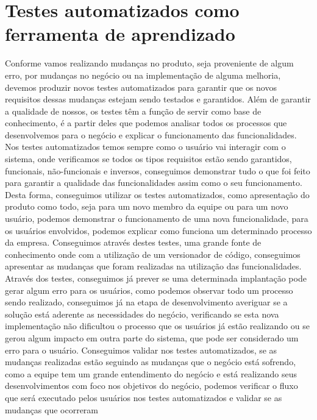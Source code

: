     \section{Testes automatizados como ferramenta de aprendizado}
      Conforme vamos realizando mudanças no produto, seja proveniente de algum erro,
      por mudanças no negócio ou na implementação de alguma melhoria, devemos produzir
      novos testes automatizados para garantir que os novos requisitos dessas mudanças
      estejam sendo testados e garantidos. \newline
      Além de garantir a qualidade de nossos, os testes têm a função de servir
      como base de conhecimento, é a partir deles que podemos analisar todos os
      processos que desenvolvemos para o negócio e explicar o funcionamento das
      funcionalidades. Nos testes automatizados temos sempre como o usuário vai
      interagir com o sistema, onde verificamos se todos os tipos requisitos estão
      sendo garantidos, funcionais, não-funcionais e inversos, conseguimos demonstrar
      tudo o que foi feito para garantir a qualidade das funcionalidades assim
      como o seu funcionamento. Desta forma, conseguimos utilizar os testes automatizados,
      como apresentação do produto como todo, seja para um novo membro da equipe ou
      para um novo usuário, podemos demonstrar o funcionamento de uma nova funcionalidade,
      para os usuários envolvidos, podemos explicar como funciona um determinado
      processo da empresa. Conseguimos através destes testes, uma grande fonte de
      conhecimento onde com a utilização de um versionador de código, conseguimos
      apresentar as mudanças que foram realizadas na utilização das funcionalidades.
      Através dos testes, conseguimos já prever se uma determinada implantação pode
      gerar algum erro para os usuários, como podemos observar todo um processo sendo
      realizado, conseguimos já na etapa de desenvolvimento averiguar se a solução
      está aderente as necessidades do negócio, verificando se esta nova implementação
      não dificultou o processo que os usuários já estão realizando ou se gerou algum
      impacto em outra parte do sistema, que pode ser considerado um erro para o
      usuário. Conseguimos validar nos testes automatizados, se as mudanças realizadas
      estão seguindo as mudanças que o negócio está sofrendo, como a equipe tem um
      grande entendimento do negócio e está realizando seus desenvolvimentos com
      foco nos objetivos do negócio, podemos verificar o fluxo que será executado
      pelos usuários nos testes automatizados e validar se as mudanças que ocorreram

